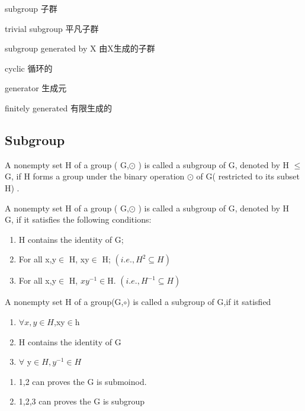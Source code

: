 \documentclass[cn,10pt,math=newtx,citestyle=gb7714-2015,bibstyle=gb7714-2015]{elegantbook}
\begin{document}
\begin{introduction}[Keywords]
    \item subgroup 子群
    \item trivial subgroup 平凡子群
    \item  subgroup generated by X 由X生成的子群
    \item cyclic 循环的
    \item generator 生成元
    \item finitely generated 有限生成的
\end{introduction}
\subsection{Subgroup}

\begin{definition}
A nonempty set H of a group ( G,$\odot$ )  is called a subgroup of G, denoted by H $\leq$ G, if H forms a group under the binary operation $\odot$  of G( restricted to its subset H) . 
\end{definition}


\begin{theorem}
    

    A nonempty set H of a group ( G,$\odot$ ) is called a subgroup of G, denoted by H  G, if it satisfies the following conditions:
    \begin{enumerate}
        \item H contains the identity of G;
        \item For all x,y$\in$ H, xy$\in$ H; $\left( i.e., H^{2}\subseteq H \right)$
        \item For all x,y$\in$ H, $xy^{-1}$$ \in $H. $\left( i.e., H^{-1}  \subseteq H\right)$
    \end{enumerate}
\end{theorem}
\begin{definition}
    A nonempty set H of a group(G,$\circ$) is called a subgroup of G,if it satisfied
    \begin{enumerate}
        \item $\forall x,y\in H$,xy$\in$h
        \item H contains the identity of G
        \item $\forall$ y$\in H,y^{-1}\in H$
    \end{enumerate}
\end{definition}
\begin{note}
    \begin{enumerate}
        \item 1,2 can proves the G is submoinod.
        \item 1,2,3 can proves the G is subgroup
    \end{enumerate}
\end{note}
\end{document}
